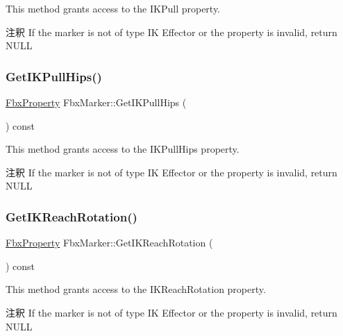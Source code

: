 This method grants access to the I\+K\+Pull property. \begin{DoxyRemark}{注釈}
If the marker is not of type IK Effector or the property is invalid, return N\+U\+LL 
\end{DoxyRemark}
\mbox{\label{class_fbx_marker_a09dac448601eb60dffb30ad24ec8ba7d}} 
\subsubsection{\texorpdfstring{Get\+I\+K\+Pull\+Hips()}{GetIKPullHips()}}
{\footnotesize\ttfamily \hyperlink{class_fbx_property}{Fbx\+Property} Fbx\+Marker\+::\+Get\+I\+K\+Pull\+Hips (\begin{DoxyParamCaption}{ }\end{DoxyParamCaption}) const}

This method grants access to the I\+K\+Pull\+Hips property. \begin{DoxyRemark}{注釈}
If the marker is not of type IK Effector or the property is invalid, return N\+U\+LL 
\end{DoxyRemark}
\mbox{\label{class_fbx_marker_a5e7e9d3e6ed1778fcb6677aff71f721c}} 
\subsubsection{\texorpdfstring{Get\+I\+K\+Reach\+Rotation()}{GetIKReachRotation()}}
{\footnotesize\ttfamily \hyperlink{class_fbx_property}{Fbx\+Property} Fbx\+Marker\+::\+Get\+I\+K\+Reach\+Rotation (\begin{DoxyParamCaption}{ }\end{DoxyParamCaption}) const}

This method grants access to the I\+K\+Reach\+Rotation property. \begin{DoxyRemark}{注釈}
If the marker is not of type IK Effector or the property is invalid, return N\+U\+LL 
\end{DoxyRemark}
\mbox{\label{class_fbx_marker_afa65bea29bdabf19c1f1076c31c2a59d}} 
